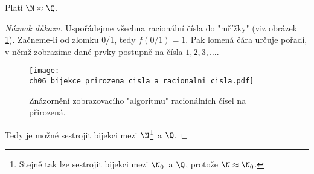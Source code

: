 \begin{theorem}\label{thm:N_a_Q}
    Platí $\N\approx\Q$.
\end{theorem}
\begin{proof}[Náznak důkazu]
    Uspořádejme všechna racionální čísla do "mřížky" (viz obrázek \ref{fig:bijekce_prirozena_cisla_a_racionalni_cisla}). Začneme-li od zlomku $0/1$, tedy $f(0/1)=1$. Pak lomená čára určuje pořadí, v němž zobrazíme dané prvky postupně na čísla $1,2,3,\dots$.
    \begin{figure}[H]
        \centering
        \texttt{[image: ch06\_bijekce\_prirozena\_cisla\_a\_racionalni\_cisla.pdf]}
        \caption{Znázornění zobrazovacího "algoritmu" racionálních čísel na přirozená.}
        \label{fig:bijekce_prirozena_cisla_a_racionalni_cisla}
    \end{figure}
    Tedy je možné sestrojit bijekci mezi $\N$\footnote{Stejně tak lze sestrojit bijekci mezi $\N_0$~a $\Q$, protože $\N\approx\N_0$.}~a $\Q$.
\end{proof}
\medskip

